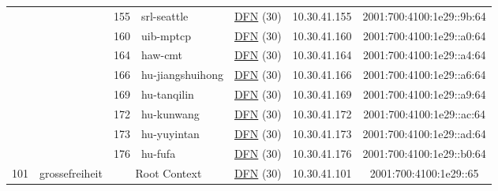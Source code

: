 \begin{small}
\begin{center}
\begin{longtable}{|c|c|c|c|c|c|c|c|}
  &  & \tiny{155} & \multicolumn{1}{|l|}{\tiny{srl-seattle}} & \multicolumn{2}{|c|}{\tiny{\href{https://www.dfn.de}{DFN} (30)}} & \tiny{10.30.41.155} & \tiny{2001:700:4100:1e29::9b:64} \\* \cline{3-3}\cline{4-4}\cline{5-5}\cline{6-6}\cline{7-7}\cline{8-8}
  &  & \tiny{160} & \multicolumn{1}{|l|}{\tiny{uib-mptcp}} & \multicolumn{2}{|c|}{\tiny{\href{https://www.dfn.de}{DFN} (30)}} & \tiny{10.30.41.160} & \tiny{2001:700:4100:1e29::a0:64} \\* \cline{3-3}\cline{4-4}\cline{5-5}\cline{6-6}\cline{7-7}\cline{8-8}
  &  & \tiny{164} & \multicolumn{1}{|l|}{\tiny{haw-cmt}} & \multicolumn{2}{|c|}{\tiny{\href{https://www.dfn.de}{DFN} (30)}} & \tiny{10.30.41.164} & \tiny{2001:700:4100:1e29::a4:64} \\* \cline{3-3}\cline{4-4}\cline{5-5}\cline{6-6}\cline{7-7}\cline{8-8}
  &  & \tiny{166} & \multicolumn{1}{|l|}{\tiny{hu-jiangshuihong}} & \multicolumn{2}{|c|}{\tiny{\href{https://www.dfn.de}{DFN} (30)}} & \tiny{10.30.41.166} & \tiny{2001:700:4100:1e29::a6:64} \\* \cline{3-3}\cline{4-4}\cline{5-5}\cline{6-6}\cline{7-7}\cline{8-8}
  &  & \tiny{169} & \multicolumn{1}{|l|}{\tiny{hu-tanqilin}} & \multicolumn{2}{|c|}{\tiny{\href{https://www.dfn.de}{DFN} (30)}} & \tiny{10.30.41.169} & \tiny{2001:700:4100:1e29::a9:64} \\* \cline{3-3}\cline{4-4}\cline{5-5}\cline{6-6}\cline{7-7}\cline{8-8}
  &  & \tiny{172} & \multicolumn{1}{|l|}{\tiny{hu-kunwang}} & \multicolumn{2}{|c|}{\tiny{\href{https://www.dfn.de}{DFN} (30)}} & \tiny{10.30.41.172} & \tiny{2001:700:4100:1e29::ac:64} \\* \cline{3-3}\cline{4-4}\cline{5-5}\cline{6-6}\cline{7-7}\cline{8-8}
  &  & \tiny{173} & \multicolumn{1}{|l|}{\tiny{hu-yuyintan}} & \multicolumn{2}{|c|}{\tiny{\href{https://www.dfn.de}{DFN} (30)}} & \tiny{10.30.41.173} & \tiny{2001:700:4100:1e29::ad:64} \\* \cline{3-3}\cline{4-4}\cline{5-5}\cline{6-6}\cline{7-7}\cline{8-8}
  &  & \tiny{176} & \multicolumn{1}{|l|}{\tiny{hu-fufa}} & \multicolumn{2}{|c|}{\tiny{\href{https://www.dfn.de}{DFN} (30)}} & \tiny{10.30.41.176} & \tiny{2001:700:4100:1e29::b0:64} \\ \hline
 \multirow{27}{*}{\tiny{101}} & \multicolumn{1}{|l|}{\multirow{27}{*}{\tiny{grossefreiheit}}} & \multicolumn{2}{|c|}{\tiny{Root Context}} & \multicolumn{2}{|c|}{\tiny{\href{https://www.dfn.de}{DFN} (30)}} & \tiny{10.30.41.101} & \tiny{2001:700:4100:1e29::65} \\* \cline{3-3}\cline{4-4}\cline{5-5}\cline{6-6}\cline{7-7}\cline{8-8}

\end{longtable}
\end{center}
\end{small}
